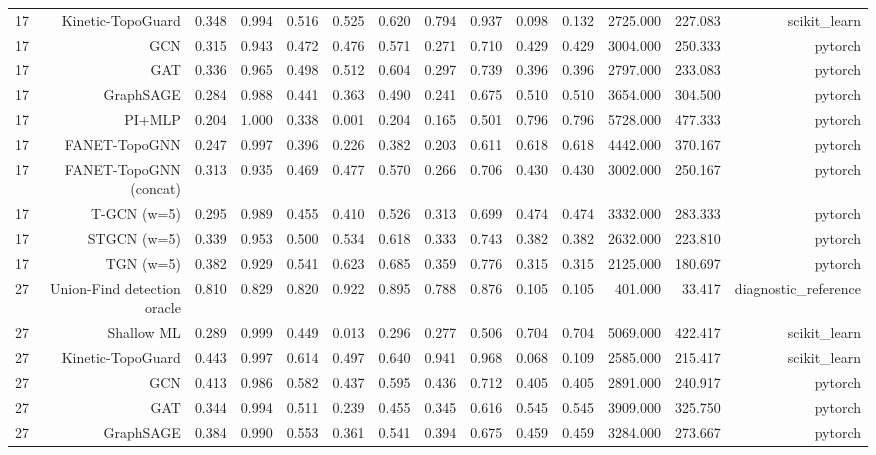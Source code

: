 \begin{tabular}{lrrrrrrrrrrrrr}
17 & Kinetic-TopoGuard & 0.348 & 0.994 & 0.516 & 0.525 & 0.620 & 0.794 & 0.937 & 0.098 & 0.132 & 2725.000 & 227.083 & scikit\_learn \\
17 & GCN & 0.315 & 0.943 & 0.472 & 0.476 & 0.571 & 0.271 & 0.710 & 0.429 & 0.429 & 3004.000 & 250.333 & pytorch \\
17 & GAT & 0.336 & 0.965 & 0.498 & 0.512 & 0.604 & 0.297 & 0.739 & 0.396 & 0.396 & 2797.000 & 233.083 & pytorch \\
17 & GraphSAGE & 0.284 & 0.988 & 0.441 & 0.363 & 0.490 & 0.241 & 0.675 & 0.510 & 0.510 & 3654.000 & 304.500 & pytorch \\
17 & PI+MLP & 0.204 & 1.000 & 0.338 & 0.001 & 0.204 & 0.165 & 0.501 & 0.796 & 0.796 & 5728.000 & 477.333 & pytorch \\
17 & FANET-TopoGNN & 0.247 & 0.997 & 0.396 & 0.226 & 0.382 & 0.203 & 0.611 & 0.618 & 0.618 & 4442.000 & 370.167 & pytorch \\
17 & FANET-TopoGNN (concat) & 0.313 & 0.935 & 0.469 & 0.477 & 0.570 & 0.266 & 0.706 & 0.430 & 0.430 & 3002.000 & 250.167 & pytorch \\
17 & T-GCN (w=5) & 0.295 & 0.989 & 0.455 & 0.410 & 0.526 & 0.313 & 0.699 & 0.474 & 0.474 & 3332.000 & 283.333 & pytorch \\
17 & STGCN (w=5) & 0.339 & 0.953 & 0.500 & 0.534 & 0.618 & 0.333 & 0.743 & 0.382 & 0.382 & 2632.000 & 223.810 & pytorch \\
17 & TGN (w=5) & 0.382 & 0.929 & 0.541 & 0.623 & 0.685 & 0.359 & 0.776 & 0.315 & 0.315 & 2125.000 & 180.697 & pytorch \\
27 & Union-Find detection oracle & 0.810 & 0.829 & 0.820 & 0.922 & 0.895 & 0.788 & 0.876 & 0.105 & 0.105 & 401.000 & 33.417 & diagnostic\_reference \\
27 & Shallow ML & 0.289 & 0.999 & 0.449 & 0.013 & 0.296 & 0.277 & 0.506 & 0.704 & 0.704 & 5069.000 & 422.417 & scikit\_learn \\
27 & Kinetic-TopoGuard & 0.443 & 0.997 & 0.614 & 0.497 & 0.640 & 0.941 & 0.968 & 0.068 & 0.109 & 2585.000 & 215.417 & scikit\_learn \\
27 & GCN & 0.413 & 0.986 & 0.582 & 0.437 & 0.595 & 0.436 & 0.712 & 0.405 & 0.405 & 2891.000 & 240.917 & pytorch \\
27 & GAT & 0.344 & 0.994 & 0.511 & 0.239 & 0.455 & 0.345 & 0.616 & 0.545 & 0.545 & 3909.000 & 325.750 & pytorch \\
27 & GraphSAGE & 0.384 & 0.990 & 0.553 & 0.361 & 0.541 & 0.394 & 0.675 & 0.459 & 0.459 & 3284.000 & 273.667 & pytorch \\

\end{tabular}
